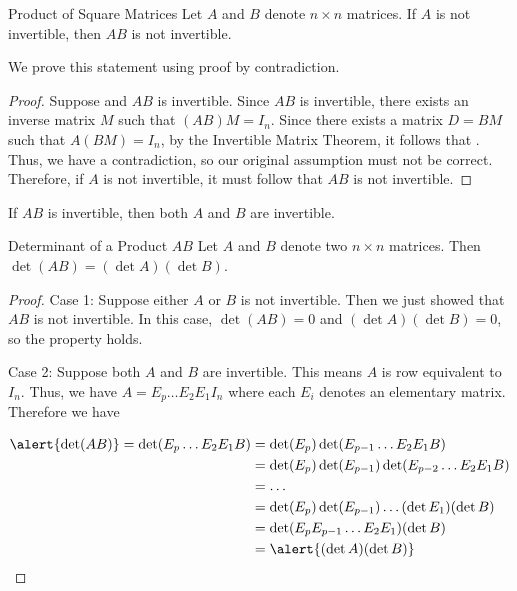 \documentclass[xcolor=dvipsnames,aspectratio=169,t]{beamer}
\begin{document}
\begin{frame}{Product of Square Matrices}
  \bbox
  Let $A$ and $B$ denote $n \times n$ matrices. If \alert{$A$ is not invertible}, then \alert{$AB$ is not invertible.}
  \ebox

  We prove this statement using proof by contradiction.

  \pause
  \begin{proof}
  Suppose  and \alert{$AB$ is invertible}. Since $AB$ is invertible, there exists an inverse matrix $M$ such that $(AB)M = I_n$.
  \pause
  Since there exists a matrix $D=BM$ such that $A(BM) = I_n$, by the Invertible Matrix Theorem, it follows that . Thus, we have a contradiction, so our original assumption must not be correct. Therefore, if $A$ is not invertible, it must follow that $AB$ is not invertible.
  \end{proof}

  \pause
  \bbox
  If \alert{$AB$ is invertible}, then \alert{both $A$ and $B$ are invertible}.
  \ebox
\end{frame}

\begin{frame}{Determinant of a Product $AB$}
\bbox
Let $A$ and $B$ denote two $n \times n$ matrices. Then \alert{$\det (AB) = (\det A) (\det B)$}.
\ebox

\pause
{\small
\begin{proof}
\alert{Case 1: Suppose either $A$ or $B$ is not invertible.} Then we just showed that $AB$ is not invertible. In this case, $\det (AB) =0$ and $ (\det A) (\det B)=0$, so the property holds.

\pause
\alert{Case 2: Suppose both $A$ and $B$ are invertible.} This means $A$ is row equivalent to $I_n$. Thus, we have  $A = E_p \ldots E_2 E_1 I_n$ where each $E_i$ denotes an elementary matrix. 
\pause
Therefore we have 

\vspace{-0.2in}

\begin{align*}
\alert{\det (AB)} = \det( E_p \ldots E_2 E_1 B) &= \det(E_p) \det(E_{p-1} \ldots E_2 E_1 B) \\
& = \det(E_p) \det(E_{p-1}) \det(E_{p-2} \ldots E_2 E_1 B) \\
&= \ldots \\
&= \det(E_p) \det(E_{p-1}) \ldots (\det E_1) (\det B) \\
&= \det( E_p E_{p-1} \ldots E_2 E_1) (\det B)\\
&= \alert{(\det A) (\det B)}\qedhere
\end{align*}
\end{proof}
}

\end{frame}
\end{document}
